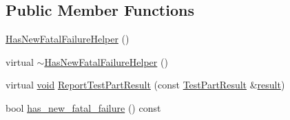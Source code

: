 \subsection*{Public Member Functions}
\begin{DoxyCompactItemize}
\item 
\hyperlink{classtesting_1_1internal_1_1HasNewFatalFailureHelper_a59190a7188db558c00b4c6bf9251859a}{Has\-New\-Fatal\-Failure\-Helper} ()
\item 
virtual \hyperlink{classtesting_1_1internal_1_1HasNewFatalFailureHelper_ae9207df58c9ca17b8243b6b664b402fa}{$\sim$\-Has\-New\-Fatal\-Failure\-Helper} ()
\item 
virtual \hyperlink{legacy_8hpp_a8bb47f092d473522721002c86c13b94e}{void} \hyperlink{classtesting_1_1internal_1_1HasNewFatalFailureHelper_ac7b5e77c9847b2b057cb97193ba82441}{Report\-Test\-Part\-Result} (const \hyperlink{classtesting_1_1TestPartResult}{Test\-Part\-Result} \&\hyperlink{legacy_8hpp_a0bb77d54f6769867cfdf389897bd8e43}{result})
\item 
bool \hyperlink{classtesting_1_1internal_1_1HasNewFatalFailureHelper_ae137e639098071f11f531bbd72dde1c7}{has\-\_\-new\-\_\-fatal\-\_\-failure} () const 
\end{DoxyCompactItemize}


